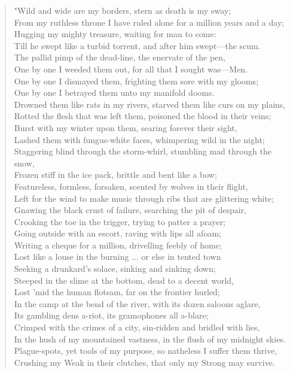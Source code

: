 \begin{verse}
"Wild and wide are my borders, stern as death is my sway;\\
From my ruthless throne I have ruled alone for a million years and a day;\\
Hugging my mighty treasure, waiting for man to come:\\
Till he swept like a turbid torrent, and after him swept—the scum.\\
The pallid pimp of the dead-line, the enervate of the pen,\\
One by one I weeded them out, for all that I sought was—Men.\\
One by one I dismayed them, frighting them sore with my glooms;\\
One by one I betrayed them unto my manifold dooms.\\
Drowned them like rats in my rivers, starved them like curs on my plains,\\
Rotted the flesh that was left them, poisoned the blood in their veins;\\
Burst with my winter upon them, searing forever their sight,\\
Lashed them with fungus-white faces, whimpering wild in the night;\\
Staggering blind through the storm-whirl, stumbling mad through the snow,\\
Frozen stiff in the ice pack, brittle and bent like a bow;\\
Featureless, formless, forsaken, scented by wolves in their flight,\\
Left for the wind to make music through ribs that are glittering white;\\
Gnawing the black crust of failure, searching the pit of despair,\\
Crooking the toe in the trigger, trying to patter a prayer;\\
Going outside with an escort, raving with lips all afoam;\\
Writing a cheque for a million, drivelling feebly of home;\\
Lost like a louse in the burning ... or else in tented town\\
Seeking a drunkard's solace, sinking and sinking down;\\
Steeped in the slime at the bottom, dead to a decent world,\\
Lost 'mid the human flotsam, far on the frontier hurled;\\
In the camp at the bend of the river, with its dozen saloons aglare,\\
Its gambling dens a-riot, its gramophones all a-blare;\\
Crimped with the crimes of a city, sin-ridden and bridled with lies,\\
In the hush of my mountained vastness, in the flush of my midnight skies.\\
Plague-spots, yet tools of my purpose, so natheless I suffer them thrive,\\
Crushing my Weak in their clutches, that only my Strong may survive.


\end{verse}
